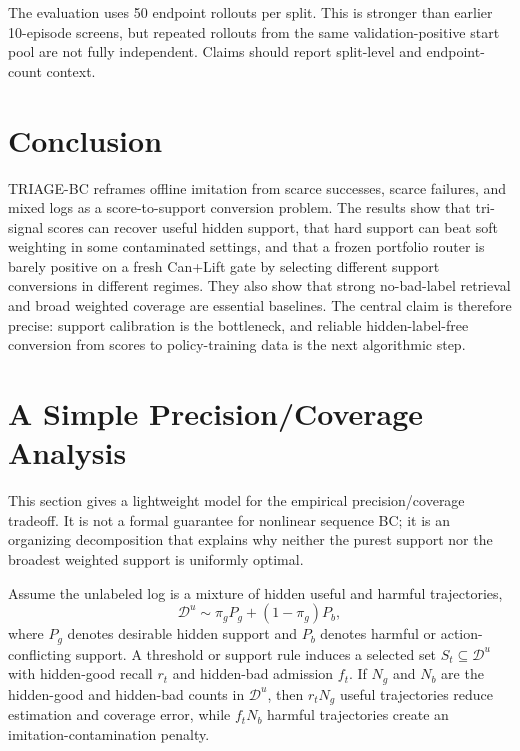 \documentclass{article}
\newcommand{\Dunl}{\mathcal{D}^{u}}
\newcommand{\method}{TRIAGE-BC}
\begin{document}
The evaluation uses 50 endpoint rollouts per split. This is stronger than earlier 10-episode screens, but repeated rollouts from the same validation-positive start pool are not fully independent. Claims should report split-level and endpoint-count context.

\section{Conclusion}

\method{} reframes offline imitation from scarce successes, scarce failures, and mixed logs as a score-to-support conversion problem. The results show that tri-signal scores can recover useful hidden support, that hard support can beat soft weighting in some contaminated settings, and that a frozen portfolio router is barely positive on a fresh Can+Lift gate by selecting different support conversions in different regimes. They also show that strong no-bad-label retrieval and broad weighted coverage are essential baselines. The central claim is therefore precise: support calibration is the bottleneck, and reliable hidden-label-free conversion from scores to policy-training data is the next algorithmic step.

\clearpage



\clearpage
\appendix

\section{A Simple Precision/Coverage Analysis}

This section gives a lightweight model for the empirical precision/coverage tradeoff. It is not a formal guarantee for nonlinear sequence BC; it is an organizing decomposition that explains why neither the purest support nor the broadest weighted support is uniformly optimal.

Assume the unlabeled log is a mixture of hidden useful and harmful trajectories,
\begin{equation}
  \Dunl \sim \pi_g P_g + (1-\pi_g)P_b,
\end{equation}
where $P_g$ denotes desirable hidden support and $P_b$ denotes harmful or action-conflicting support. A threshold or support rule induces a selected set $S_t \subseteq \Dunl$ with hidden-good recall $r_t$ and hidden-bad admission $f_t$. If $N_g$ and $N_b$ are the hidden-good and hidden-bad counts in $\Dunl$, then $r_tN_g$ useful trajectories reduce estimation and coverage error, while $f_tN_b$ harmful trajectories create an imitation-contamination penalty.
\end{document}
